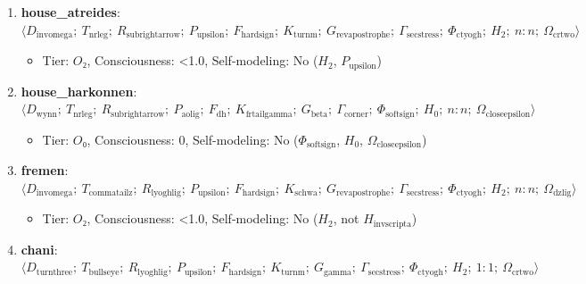 \documentclass[12pt,a4paper]{article}
\begin{document}
\begin{enumerate}
    \begin{itemize}
    \item Tier: $O_{\infty}$-adjacent, Consciousness: \textless{}1.0, Self-modeling: No ($P_{\text{upsilon}}$ not $P_{\text{doublebarpipe}}$)
\end{itemize}

    \item 
    \textbf{house\_atreides}: $\langle D_{\text{invomega}};\ T_{\text{nrleg}};\ R_{\text{subrightarrow}};\ P_{\text{upsilon}};\ F_{\text{hardsign}};\ K_{\text{turnm}};\ G_{\text{revapostrophe}};\ \Gamma_{\text{secstress}};\ \Phi_{\text{ctyogh}};\ H_2;\ n{:}n;\ \Omega_{\text{crtwo}} \rangle$

    \begin{itemize}
    \item Tier: $O₂$, Consciousness: \textless{}1.0, Self-modeling: No ($H_2$, $P_{\text{upsilon}}$)
\end{itemize}

    \item 
    \textbf{house\_harkonnen}: $\langle D_{\text{wynn}};\ T_{\text{nrleg}};\ R_{\text{subrightarrow}};\ P_{\text{aolig}};\ F_{\text{dh}};\ K_{\text{frtailgamma}};\ G_{\text{beta}};\ \Gamma_{\text{corner}};\ \Phi_{\text{softsign}};\ H_0;\ n{:}n;\ \Omega_{\text{closeepsilon}} \rangle$

    \begin{itemize}
    \item Tier: $O₀$, Consciousness: 0, Self-modeling: No ($\Phi_{\text{softsign}}$, $H_0$, $\Omega_{\text{closeepsilon}}$)
\end{itemize}

    \item 
    \textbf{fremen}: $\langle D_{\text{invomega}};\ T_{\text{commatailz}};\ R_{\text{lyoghlig}};\ P_{\text{upsilon}};\ F_{\text{hardsign}};\ K_{\text{schwa}};\ G_{\text{revapostrophe}};\ \Gamma_{\text{secstress}};\ \Phi_{\text{ctyogh}};\ H_2;\ n{:}n;\ \Omega_{\text{dzlig}} \rangle$

    \begin{itemize}
    \item Tier: $O₂$, Consciousness: \textless{}1.0, Self-modeling: No ($H_2$, not $H_{\text{invscripta}}$)
\end{itemize}

    \item 
    \textbf{chani}: $\langle D_{\text{turnthree}};\ T_{\text{bullseye}};\ R_{\text{lyoghlig}};\ P_{\text{upsilon}};\ F_{\text{hardsign}};\ K_{\text{turnm}};\ G_{\text{gamma}};\ \Gamma_{\text{secstress}};\ \Phi_{\text{ctyogh}};\ H_2;\ 1{:}1;\ \Omega_{\text{crtwo}} \rangle$


\end{enumerate}
\end{document}
